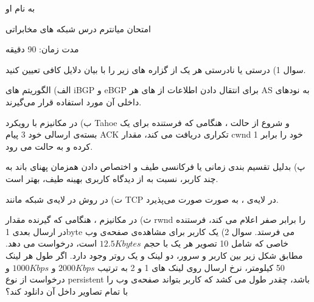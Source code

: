 \documentclass[10pt,letterpaper]{article}
\begin{document}
\Large
\begin{center}
به نام او

امتحان میانترم درس شبکه های مخابراتی

مدت زمان: 90 دقیقه

\hrulefill
\end{center}
سوال 1) درستی یا نادرستی هر یک از گزاره های زیر را با بیان دلایل کافی تعیین کنید.

الف) الگوریتم های iBGP و eBGP برای انتقال دادن اطلاعات از  های هر AS به نودهای داخلی آن مورد استفاده قرار می‌گیرند.

ب) در مکانیزم  با رویکرد Tahoe و شروع از حالت ، هنگامی که فرستنده برای یک بسته‌ی ارسالی خود 3 پیام ACK تکراری دریافت می کند، مقدار cwnd خود را برابر 1 کرده و به حالت  می رود.

پ)  بدلیل تقسیم بندی زمانی یا فرکانسی طیف و اختصاص دادن همزمان پهنای باند به چند کاربر، نسبت به  از دیدگاه کاربری بهینه طیف، بهتر است.

ت) در روش  در لایه‌ی شبکه مانند TCP در لایه‌ی ،  به صورت  صورت می‌پذیرد.

ث) در مکانیزم ، هنگامی که گیرنده مقدار rwnd را برابر صفر اعلام می کند، فرستنده در ارسال بعدی 1byte می فرستد.
\newpage
سوال 2) یک کاربر برای مشاهده‌ی صفحه‌ی وب خاصی که شامل 10 تصویر هر یک با حجم 
$
12.5Kbytes
$
است، درخواست می دهد. مطابق شکل زیر بین کاربر و سرور، دو لینک و یک روتر وجود دارد. اگر طول هر لینک 50 کیلومتر، نرخ ارسال روی لینک های 1 و 2 به ترتیب 
$
2000 Kbps
$
 و
$
1000 Kbps
$
و درخواست از نوع 
persistent
باشد، چقدر طول می کشد که کاربر بتواند صفحه‌ی وب را با تمام تصاویر داخل آن دانلود کند؟
\end{document}
